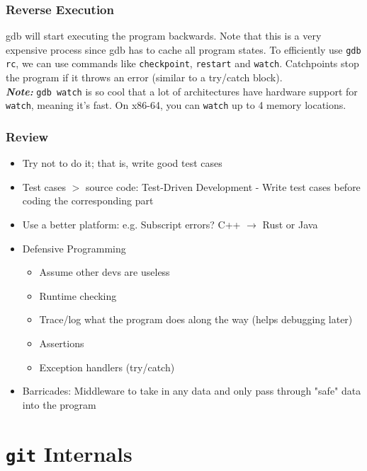 \documentclass[13pt]{article}
\begin{document}
\subsubsection*{Reverse Execution}
gdb will start executing the program backwards. Note that this is a very expensive process since gdb has to cache all program states. To efficiently use \texttt{gdb rc}, we can use commands like \texttt{checkpoint}, \texttt{restart} and \texttt{watch}. Catchpoints stop the program if it throws an error (similar to a try/catch block). \\
\textit{\textbf{Note:}} \texttt{gdb watch} is so cool that a lot of architectures have hardware support for \texttt{watch}, meaning it's fast. On x86-64, you can \texttt{watch} up to 4 memory locations. 

\subsubsection{Review}
\begin{itemize}[label=]
\item Try not to do it; that is, write good test cases
\item Test cases $>$ source code: Test-Driven Development - Write test cases before coding the corresponding part
\item Use a better platform: e.g. Subscript errors? C++ $\rightarrow$ Rust or Java
\item Defensive Programming
  \begin{itemize}[label=]
  \item Assume other devs are useless
  \item Runtime checking
  \item Trace/log what the program does along the way (helps debugging later)
  \item Assertions
  \item Exception handlers (try/catch)
  \end{itemize}
\item Barricades: Middleware to take in any data and only pass through "safe" data into the program
\end{itemize}




\section{\texttt{git} Internals}
\end{document}
